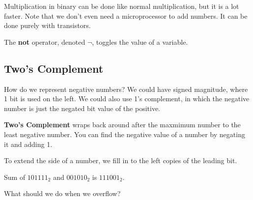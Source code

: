 
Multiplication in binary can be done like normal multiplication, but it is a lot faster. Note that we don't even need a microprocessor to add numbers. It can be done purely with transistors.

\begin{definition}
	The \textbf{not} operator, denoted \( \neg \), toggles the value of a variable.
\end{definition}

\subsection{Two's Complement}

How do we represent negative numbers? We could have signed magnitude, where 1 bit is used on the left. We could also use 1's complement, in which the negative number is just the negated bit value of the positive.

\begin{definition}
	\textbf{Two's Complement} wraps back around after the maxmimum number to the least negative number. You can find the negative value of a number by negating it and adding 1.
\end{definition}

To extend the side of a number, we fill in to the left copies of the leading bit.

\begin{eg}
	Sum of \( 101111_2 \) and \( 001010_2 \) is \( 111001_2 \).
\end{eg}

What should we do when we overflow?
